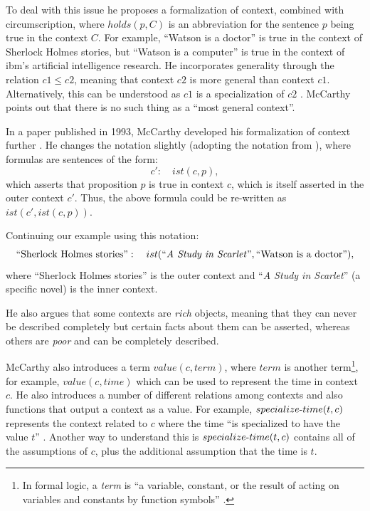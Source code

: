 To deal with this issue he proposes a formalization of context, combined with circumscription, where $holds(p, C)$ is an abbreviation for the sentence $p$ being true in the context $C$. For example, ``Watson is a doctor'' is true in the context of Sherlock Holmes stories, but ``Watson is a computer'' is true in the context of \acrshort{ibm}'s artificial intelligence research. He incorporates generality through the relation $c1 \le c2$, meaning that context $c2$ is more general than context $c1$. Alternatively, this can be understood as $c1$ is a specialization of $c2$ \cite{akman1996steps}. McCarthy points out that there is no such thing as a ``most general context''.

In a paper published in 1993, McCarthy developed his formalization of context further \cite{McCarthy1993}. He changes the notation slightly (adopting the notation from \cite{guha1991contexts}), where formulas are sentences of the form:
\begin{equation}
  \label{eq:ist1}
 c': \quad	ist(c,p),
\end{equation}
which asserts that proposition $p$ is true in context $c$, which is itself asserted in the outer context $c'$. Thus, the above formula could be re-written as $ist(c', ist(c,p))$. 

Continuing our example using this notation:
\begin{equation}
  \label{eq:context1}
 \text{``Sherlock Holmes stories''}: \quad	ist(\text{``\emph{A Study in Scarlet}''},\text{``Watson is a doctor''}),
\end{equation}
where ``Sherlock Holmes stories'' is the outer context and ``\emph{A Study in Scarlet}'' (a specific novel) is the inner context.

He also argues that some contexts are \emph{rich} objects, meaning that they can never be described completely but certain facts about them can be asserted, whereas others are \emph{poor} and can be completely described.

McCarthy also introduces a term $value(c,term)$, where $term$ is another term\footnote{In formal logic, a \emph{term} is ``a variable, constant, or the result of acting on variables and constants by function symbols'' \cite{Weisstein2014}.}, for example, $value(c,time)$ which can be used to represent the time in context $c$. He also introduces a number of different relations among contexts and also functions that output a context as a value. For example, $specialize\textnormal{-}time(t, c)$ represents the context related to $c$ where the time ``is specialized to have the value $t$'' \cite{McCarthy1993}. Another way to understand this is $specialize\textnormal{-}time(t, c)$ contains all of the assumptions of $c$, plus the additional assumption that the time is $t$.

